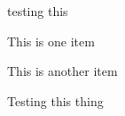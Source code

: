 
\begin{DoxyRefList}
\item[\label{todo__todo000001}%
\Hypertarget{todo__todo000001}%
File \hyperlink{gui_8py}{gui.py} ]testing this
\begin{DoxyItemize}
\item This is one item
\item This is another item
\item Testing this thing 
\end{DoxyItemize}
\end{DoxyRefList}